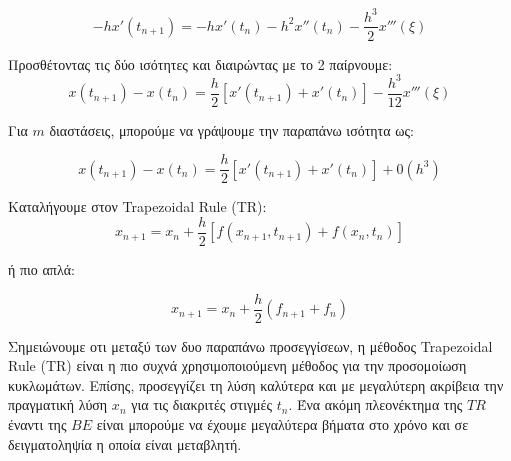 \begin{enumerate}
    \begin{equation}
      -h x'(t_{n+1}) = -h x'(t_n) - h^2 x''(t_n) - \frac{h^3}{2}x'''(\xi)
    \end{equation}
    
    Προσθέτοντας τις δύο ισότητες και διαιρώντας με το 2 παίρνουμε:
    \begin{equation}
        x(t_{n+1}) - x(t_n) = \frac{h}{2} [ x'(t_{n+1}) + x'(t_n)] - \frac{h^3}{12} x'''(\xi)
    \end{equation}
    
    Για $m$ διαστάσεις, μπορούμε να γράψουμε την παραπάνω ισότητα ως:
    
    \begin{equation}
        x(t_{n+1}) - x(t_n) = \frac{h}{2} [x'(t_{n+1}) + x'(t_n)] + 0(h^3)
    \end{equation}
    
    Καταλήγουμε στον \textlatin{Trapezoidal Rule (TR)}:
    \begin{equation}
        x_{n+1} = x_n + \frac{h}{2} [ f(x_{n+1}, t_{n+1}) + f(x_n, t_n)]
    \end{equation}
    
    ή πιο απλά:
    
    \begin{equation}
        x_{n+1} = x_n + \frac{h}{2} (f_{n+1} + f_n)
    \end{equation}
    
    
\end{enumerate}

Σημειώνουμε οτι μεταξύ των δυο παραπάνω προσεγγίσεων, η μέθοδος \textlatin{Trapezoidal Rule (TR)} είναι η πιο συχνά χρησιμοποιούμενη μέθοδος για την προσομοίωση κυκλωμάτων. Επίσης, προσεγγίζει τη λύση καλύτερα και με μεγαλύτερη ακρίβεια την πραγματική λύση $x_n$ για τις διακριτές στιγμές $t_n$. Ένα ακόμη πλεονέκτημα της $TR$ έναντι της $BE$ είναι μπορούμε να έχουμε μεγαλύτερα βήματα στο χρόνο και σε δειγματοληψία η οποία είναι μεταβλητή.
